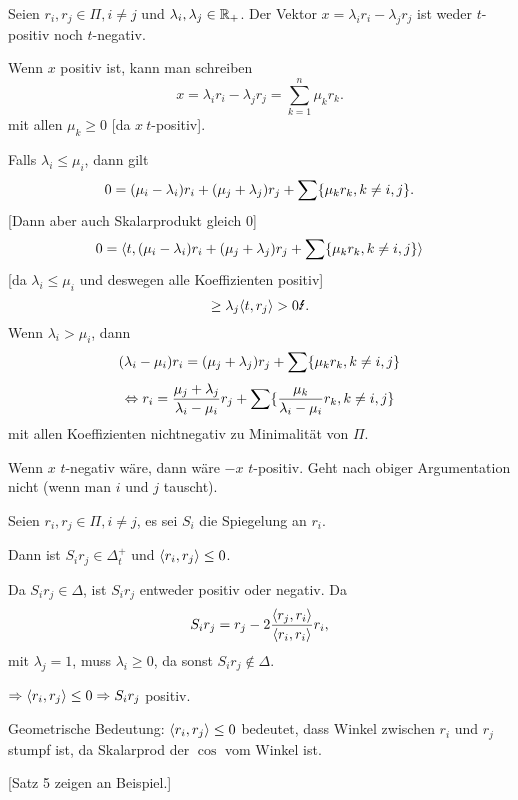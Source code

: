 \documentclass[12pt]{extarticle}
\begin{document}
\begin{satz} %
    Seien \( r_i, r_j \in \Pi, i \neq j \) und 
    \( \lambda_i, \lambda_j \in \mathbb{R}_+ \). 
    Der Vektor \( x = \lambda_i r_i - \lambda_j r_j \) 
    ist weder \( t \)-positiv noch \( t \)-negativ.
\end{satz}
\begin{bew}
    Wenn \( x \) positiv ist, kann man schreiben 
    \[ x = \lambda_i r_i - \lambda_j r_j = \sum_{k=1}^n \mu_k r_k. \]
    mit allen \( \mu_k \geq 0 \) [da \(x \ t\)-positiv].
    
    Falls \( \lambda_i \leq \mu_i \), dann gilt 
    \[ 0 = (\mu_i - \lambda_i) r_i + (\mu_j + \lambda_j) r_j 
    + \sum \{\mu_k r_k, k \neq i,j\}. \]
    [Dann aber auch Skalarprodukt gleich \(0\)]
    \[ 0 = \langle t, (\mu_i - \lambda_i) r_i + (\mu_j + \lambda_j) r_j 
    + \sum \{\mu_k r_k, k \neq i,j\} \rangle \]
    [da \( \lambda_i \leq \mu_i \) und deswegen alle Koeffizienten positiv]
    \[ \geq \lambda_j \scalarprod{t}{r_j} > 0 \text{\Lightning{}}. \]
    Wenn \( \lambda_i > \mu_i \), dann 
    \[ (\lambda_i - \mu_i)r_i = (\mu_j + \lambda_j)r_j 
    + \sum \{\mu_k r_k, k \neq i,j\} \]
    \[ \Leftrightarrow r_i = 
    \frac{\mu_j + \lambda_j}{\lambda_i - \mu_i}r_j 
    + \sum \{\frac{\mu_k}{\lambda_i - \mu_i} r_k, k \neq i,j\} \]
    mit allen Koeffizienten nichtnegativ \Lightning{} zu Minimalität 
    von \( \Pi \).

    Wenn \( x \) \(t\)-negativ wäre, dann wäre \(-x\) \(t\)-positiv.
    Geht nach obiger Argumentation nicht (wenn man \( i \) und \(j\) 
    tauscht).
\end{bew}

\begin{satz} %
    Seien \( r_i, r_j \in \Pi, i \neq j \), es 
    sei \( S_i \) die Spiegelung an \( r_i \). 

    Dann ist \( S_i r_j \in \Delta_t^+ \) und 
    \( \langle r_i, r_j \rangle \leq 0 \).
\end{satz}
\begin{bew}
    Da \( S_i r_j \in \Delta \), ist \( S_i r_j \) 
    entweder positiv oder negativ. Da 
    \[ S_i r_j = r_j - 2 
    \frac{\langle r_j, r_i \rangle}{\langle r_i, r_i \rangle} r_i, \]
    mit \( \lambda_j = 1 \), muss 
    \( \lambda_i \geq 0 \), da sonst 
    \( S_i r_j \notin \Delta \). 

    \( \Rightarrow \langle r_i, r_j \rangle \leq 0 
    \Rightarrow S_i r_j \) 
    positiv.
\end{bew}
\begin{bem}
    Geometrische Bedeutung:
    \( \langle r_i, r_j \rangle \leq 0 \) bedeutet, 
    dass Winkel zwischen \(r_i\) und \(r_j\) 
    stumpf ist, da Skalarprod der \( \cos \) 
    vom Winkel ist.
\end{bem}
{\Large{}[Satz 5 zeigen an Beispiel.]}
\end{document}
